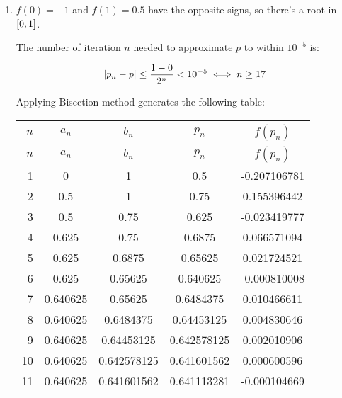 \documentclass[../../Assignments.tex]{subfiles}
\begin{document}
\begin{solution}
    \begin{enumerate}[label = (\alph*)]
        \item \(f(0) = -1\) and \(f(1) = \num{0.5}\) have the opposite signs, so
            there's a root in \(\interval{0}{1}\).

            The number of iteration \(n\) needed to approximate \(p\) to within
            \(10^{-5}\) is:

            \[\abs{p_n - p} \leq \frac{1 - 0}{2^n} < 10^{-5} \iff n \geq 17\]

            Applying Bisection method generates the following table:

            \begin{longtable}{r S[table-format=1.9] S[table-format=1.9] S[table-format=1.9] S[table-format=-1.9]}
                \toprule
                \(n\)  &   {\(a_n\)}   &   {\(b_n\)}   &   {\(p_n\)}   &  {\(f(p_n)\)}  \\
                \midrule
                \endfirsthead
                \(n\)  &   {\(a_n\)}   &   {\(b_n\)}   &   {\(p_n\)}   &  {\(f(p_n)\)}  \\
                \midrule
                  &  0            &  1            &  0.5          &  -0.207106781  \\
                    2  &  0.5          &  1            &  0.75         &   0.155396442  \\
                    3  &  0.5          &  0.75         &  0.625        &  -0.023419777  \\
                    4  &  0.625        &  0.75         &  0.6875       &   0.066571094  \\
                    5  &  0.625        &  0.6875       &  0.65625      &   0.021724521  \\
                    6  &  0.625        &  0.65625      &  0.640625     &  -0.000810008  \\
                    7  &  0.640625     &  0.65625      &  0.6484375    &   0.010466611  \\
                    8  &  0.640625     &  0.6484375    &  0.64453125   &   0.004830646  \\
                    9  &  0.640625     &  0.64453125   &  0.642578125  &   0.002010906  \\
                   10  &  0.640625     &  0.642578125  &  0.641601562  &   0.000600596  \\
                   11  &  0.640625     &  0.641601562  &  0.641113281  &  -0.000104669  \\

\end{longtable}
\end{enumerate}
\end{solution}
\end{document}
